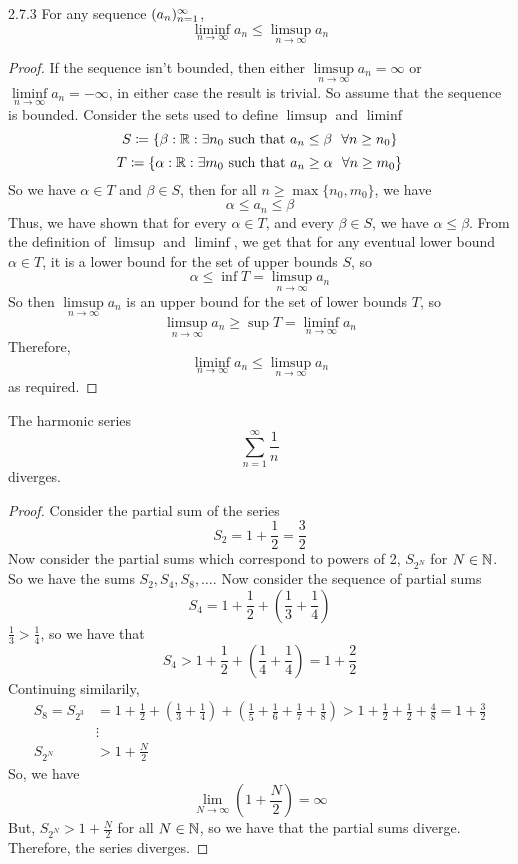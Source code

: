 \documentclass[openany]{report}
\begin{document}
    \begin{manualprop}{2.7.3}
        For any sequence $({a}_n)_{n=1}^\infty$,
        \[\liminf_{n\rightarrow\infty} a_n \leq \limsup_{n\rightarrow \infty} a_n\]
    \end{manualprop}
    \begin{proof}
        If the sequence isn't bounded, then either $\limsup\limits_{n\rightarrow\infty}a_n = \infty$ or $\liminf\limits_{n\rightarrow\infty} a_n = -\infty$, in either case the result is trivial. So assume that the sequence is bounded. Consider the sets used to define $\limsup$ and $\liminf$
        \[S \coloneqq \{\beta : \mathbb{R} : \exists n_0 \text{ such that } a_n \leq \beta \ \  \forall n \geq n_0\}\]
        \[T \coloneqq \{\alpha : \mathbb{R} : \exists m_0 \text{ such that } a_n \geq \alpha \ \ \forall n \geq m_0\}\]
        So we have $\alpha \in T$ and $\beta \in S$, then for all $n \geq \max\{n_0, m_0\}$, we have
        \[\alpha \leq a_n \leq \beta\]
        Thus, we have shown that for every $\alpha \in T$, and every $\beta \in S$, we have $\alpha \leq \beta$. From the definition of $\limsup$ and $\liminf$, we get that for any eventual lower bound $\alpha \in T$, it is a lower bound for the set of upper bounds $S$, so
        \[\alpha \leq \inf T = \limsup_{n\rightarrow\infty} a_n \]
        So then $\limsup\limits_{n\rightarrow\infty}a_n$ is an upper bound for the set of lower bounds $T$, so
        \[\limsup_{n\rightarrow\infty} a_n \geq \sup T = \liminf_{n\rightarrow\infty} a_n\]
        Therefore, 
        \[\liminf_{n\rightarrow\infty} a_n \leq \limsup_{n\rightarrow\infty} a_n\]
        as required.


    \end{proof}


    \begin{manualprop}{}
        The harmonic series 
        \[\sum_{n=1}^\infty \frac{1}{n}\]
        diverges. 
    \end{manualprop}
\begin{proof}
    Consider the partial sum of the series 
    \[S_2 = 1 + \frac{1}{2} = \frac{3}{2}\]
    Now consider the partial sums which correspond to powers of 2, $S_{2^N}$ for $N \in \mathbb{N}$. So we have the sums $S_2, S_4, S_8,\dots$. Now consider the sequence of partial sums
    \[S_4 = 1 + \frac{1}{2} + \left(\frac{1}{3} + \frac{1}{4}\right)\]
    $\frac{1}{3} > \frac{1}{4}$, so we have that 
    \[S_4 > 1 + \frac{1}{2} + \left(\frac{1}{4} + \frac{1}{4}\right) = 1 + \frac{2}{2}\]
    Continuing similarily,
    \begin{align*}
        S_8 = S_{2^3} &= 1 + \frac{1}{2} + \left(\frac{1}{3} + \frac{1}{4}\right) + \left(\frac{1}{5} + \frac{1}{6} + \frac{1}{7} + \frac{1}{8}\right) > 1 + \frac{1}{2} + \frac{1}{2} + \frac{4}{8} = 1 + \frac{3}{2}\\
        &\vdots\\
        S_{2^N} &> 1 + \frac{N}{2}
    \end{align*}
    So, we have
    \[\lim_{N\rightarrow \infty} \left(1 + \frac{N}{2}\right) = \infty\]
    But, $S_{2^N} > 1 + \frac{N}{2}$ for all $N \in \mathbb{N}$, so we have that the partial sums diverge. Therefore, the series diverges.
\end{proof}
\end{document}
